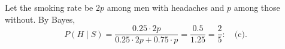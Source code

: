 Let the smoking rate be $2p$ among men with headaches and $p$ among those without. By Bayes,
\[P(H\mid S)=\dfrac{0.25\cdot2p}{0.25\cdot2p+0.75\cdot p}=\dfrac{0.5}{1.25}=\dfrac{2}{5}:\quad\boxed{\text{(c)}}.\]
